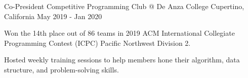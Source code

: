\begin{cventries}
  \cventry
    {Co-President} %
    {Competitive Programming Club @ De Anza College} %
    {Cupertino, California} %
    {May 2019 - Jan 2020} %
    {
	\begin{cvitems} %
      	\item Won the 14th place out of 86 teams in 2019 ACM International Collegiate Programming Contest (ICPC) Pacific Northwest Division 2. 
      	\item Hosted weekly training sessions to help members hone their algorithm, data structure, and problem-solving skills. 
	\end{cvitems}
    }    
    

\end{cventries}
